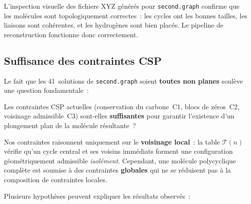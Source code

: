 \documentclass[12pt,a4paper]{article}
\theoremstyle{definition}
\theoremstyle{remark}
\begin{document}
L'inspection visuelle des fichiers XYZ g\'en\'er\'es pour
\texttt{second.graph} confirme que les mol\'ecules sont
topologiquement correctes~: les cycles ont les bonnes tailles, les
liaisons sont coh\'erentes, et les hydrog\`enes sont bien plac\'es.
Le pipeline de reconstruction fonctionne donc correctement.

\subsection{Suffisance des contraintes CSP}

Le fait que les 41~solutions de \texttt{second.graph} soient
\textbf{toutes non planes} soul\`eve une question fondamentale~:

\begin{alertbox}
Les contraintes CSP actuelles (conservation du carbone~C1, blocs de
z\'eros~C2, voisinage admissible~C3) sont-elles \textbf{suffisantes}
pour garantir l'existence d'un plongement plan de la mol\'ecule
r\'esultante~?
\end{alertbox}

Nos contraintes raisonnent uniquement sur le \textbf{voisinage local}~:
la table $\mathcal{T}(n)$ v\'erifie qu'un cycle central et ses voisins
imm\'ediats forment une configuration g\'eom\'etriquement admissible
\emph{isol\'ement}. Cependant, une mol\'ecule polycyclique compl\`ete
est soumise \`a des contraintes \textbf{globales} qui ne se r\'eduisent
pas \`a la composition de contraintes locales.

Plusieurs hypoth\`eses peuvent expliquer les r\'esultats observ\'es~:
\end{document}
